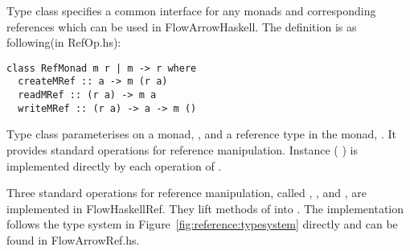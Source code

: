 Type class  specifies a common interface for any monads and corresponding references
which can be used in FlowArrowHaskell. The definition is as following(in RefOp.hs):
\begin{verbatim}
class RefMonad m r | m -> r where
  createMRef :: a -> m (r a)
  readMRef :: (r a) -> m a
  writeMRef :: (r a) -> a -> m ()
\end{verbatim}
Type class  parameterises on a monad, , and a reference type in the monad, .
It provides standard operations for reference manipulation. 
Instance (  ) is implemented directly by each operation of
.

Three standard operations for reference manipulation, called , , 
and , are implemented in FlowHaskellRef. They lift methods of  into 
. The implementation follows the type system in 
Figure~\ref{fig:reference:typesystem} directly and can be found in FlowArrowRef.hs.


